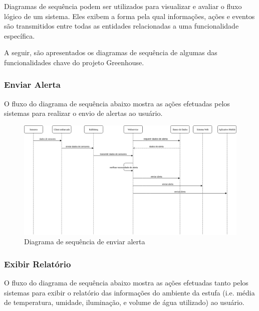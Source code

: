 Diagramas de sequência podem ser utilizados para visualizar e avaliar o fluxo lógico de um sistema. Eles exibem a forma pela qual informações, ações e eventos são transmitidos entre todas as entidades relacionadas a uma funcionalidade específica.

A seguir, são apresentados os diagramas de sequência de algumas das funcionalidades chave do projeto Greenhouse.


\subsubsection{Enviar Alerta}

O fluxo do diagrama de sequência abaixo mostra as ações efetuadas pelos sistemas para realizar o envio de alertas ao usuário.

\begin{figure}[H]
	\centering
	\includegraphics[width=17cm]{figuras/enviar_alerta.png}
	\caption{Diagrama de sequência de enviar alerta} \label{enviar_alerta}
\end{figure}

\subsubsection{Exibir Relatório}

O fluxo do diagrama de sequência abaixo mostra as ações efetuadas tanto pelos sistemas para exibir o relatório das informações do ambiente da estufa (i.e. média de temperatura, umidade, iluminação, e volume de água utilizado) ao usuário.

